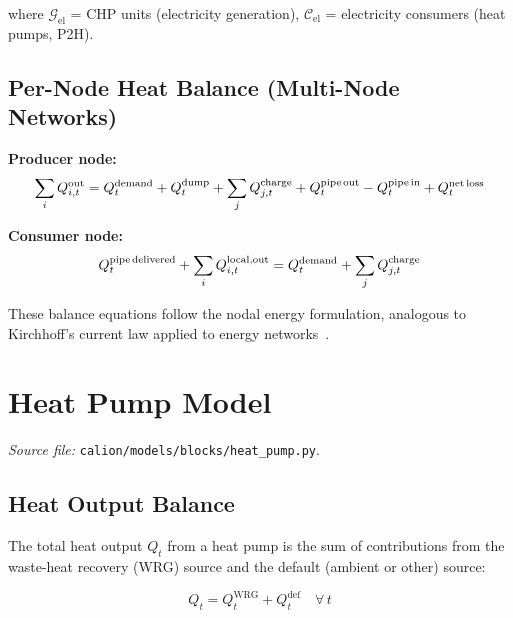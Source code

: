 \documentclass[a4paper,12pt]{article}
\begin{document}
where $\mathcal{G}_{\text{el}}$ = CHP units (electricity generation),
$\mathcal{C}_{\text{el}}$ = electricity consumers (heat pumps, P2H).

\subsection{Per-Node Heat Balance (Multi-Node Networks)}

\noindent\textbf{Producer node:}
\begin{equation}
  \sum_{i} Q^{\text{out}}_{i,t}
  = Q^{\text{demand}}_{t} + Q^{\text{dump}}_{t}
    + \sum_{j} Q^{\text{charge}}_{j,t}
    + Q^{\text{pipe\,out}}_{t} - Q^{\text{pipe\,in}}_{t}
    + Q^{\text{net\,loss}}_{t}
  \label{eq:producer-node}
\end{equation}

\noindent\textbf{Consumer node:}
\begin{equation}
  Q^{\text{pipe\,delivered}}_{t} + \sum_{i} Q^{\text{local,out}}_{i,t}
  = Q^{\text{demand}}_{t} + \sum_{j} Q^{\text{charge}}_{j,t}
  \label{eq:consumer-node}
\end{equation}

These balance equations follow the nodal energy formulation, analogous to Kirchhoff's
current law applied to energy networks~\cite{Vesterlund2017,Lund2016b}.

\section{Heat Pump Model}
\label{sec:hp}

\textit{Source file:} \texttt{calion/models/blocks/heat\_pump.py}.

\subsection{Heat Output Balance}

The total heat output $Q_{t}$ from a heat pump is the sum of contributions from the
waste-heat recovery (WRG) source and the default (ambient or other) source:

\begin{equation}
  Q_{t} = Q^{\text{WRG}}_{t} + Q^{\text{def}}_{t}
  \quad \forall\, t
  \tag{HP-1}
  \label{eq:hp1}
\end{equation}
\end{document}
